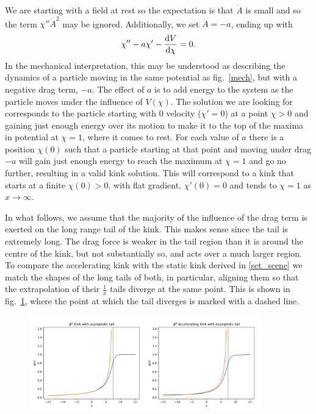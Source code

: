 \documentclass[11pt, oneside]{article}  	%
\numberwithin{equation}{section}
\newcommand{\drv}{\ensuremath{\textup{d}}}
\begin{document}
 We are starting with a field at rest so the expectation is that $\dot{A}$ is small and so the term $\chi '' \dot{A}^2$ may be ignored. Additionally, we set $\ddot{A} = -a$, ending up with
 \begin{equation} \label{acc_kink}
 \chi'' - a\chi' - \frac{\drv V }{\drv \chi}=0.
 \end{equation}
In the mechanical interpretation, this may be understood as describing the dynamics of a particle moving in the same potential as fig.~\ref{mech}, but with a negative drag term, $-a$. The effect of $a$ is to add energy to the system as the particle moves under the influence of $V(\chi)$. The solution we are looking for corresponds to the particle starting with 0 velocity ($\chi' = 0$) at a point $\chi >0$ and gaining just enough energy over its motion to make it to the top of the maxima in potential at $\chi=1$, where it comes to rest. For each value of $a$ there is a position $\chi(0)$ such that a particle starting at that point and moving under drag $-a$ will gain just enough energy to reach the maximum at $\chi=1$ and go no further, resulting in a valid kink solution. This will correspond to a kink that starts at a finite $\chi(0)>0$, with flat gradient, $\chi'(0)=0$ and tends to $\chi=1$ as $x \rightarrow \infty$.\par
In what follows, we assume that the majority of the influence of the drag term is exerted on the long range tail of the kink. This makes sense since the tail is extremely long. The drag force is weaker in the tail region than it is around the centre of the kink, but not substantially so, and acts over a much larger region. To compare the accelerating kink with the static kink derived in \textsection \ref{set_scene} we match the shapes of the long tails of both, in particular, aligning them so that the extrapolation of their $\frac{1}{x}$ tails diverge at the same point. This is shown in fig.~\ref{tails}, where the point at which the tail diverges is marked with a dashed line.\par
\begin{figure}
\centering
\includegraphics[width=0.9\textwidth]{asym_tails.png}
 \label{tails}
\end{figure}
\end{document}
